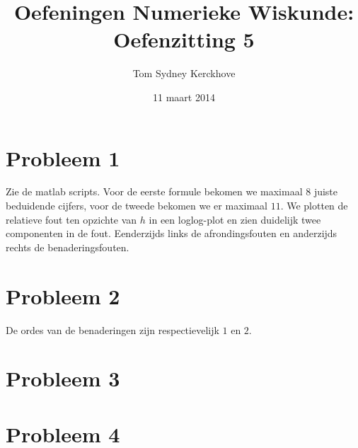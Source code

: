 \documentclass[12pt,a4paper]{article}
\author{Tom Sydney Kerckhove}
\title{Oefeningen Numerieke Wiskunde:\\ Oefenzitting 5}
\date{11 maart 2014}
\begin{document}
\maketitle

\section{Probleem 1}
Zie de matlab scripts.
Voor de eerste formule bekomen we maximaal $8$ juiste beduidende cijfers, voor de tweede bekomen we er maximaal $11$. We plotten de relatieve fout ten opzichte van $h$ in een loglog-plot en zien duidelijk twee componenten in de fout. Eenderzijds links de afrondingsfouten en anderzijds rechts de benaderingsfouten.

\section{Probleem 2}
De ordes van de benaderingen zijn respectievelijk $1$ en $2$.

\section{Probleem 3}

\section{Probleem 4}

\listoftodos
\end{document}
